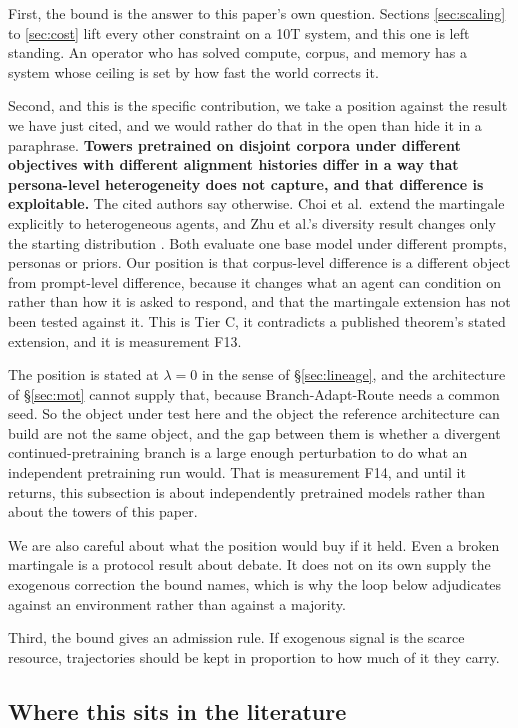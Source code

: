\documentclass[11pt]{article}
\begin{document}
First, the bound is the answer to this paper's own question. Sections \ref{sec:scaling} to \ref{sec:cost} lift every other constraint on a 10T system, and this one is left standing. An operator who has solved compute, corpus, and memory has a system whose ceiling is set by how fast the world corrects it.

Second, and this is the specific contribution, we take a position against the result we have just cited, and we would rather do that in the open than hide it in a paraphrase. \textbf{Towers pretrained on disjoint corpora under different objectives with different alignment histories differ in a way that persona-level heterogeneity does not capture, and that difference is exploitable.} The cited authors say otherwise. Choi et al.\ extend the martingale explicitly to heterogeneous agents, and Zhu et al.'s diversity result changes only the starting distribution \cite{choi2025debatevote,zhu2026debate}. Both evaluate one base model under different prompts, personas or priors. Our position is that corpus-level difference is a different object from prompt-level difference, because it changes what an agent can condition on rather than how it is asked to respond, and that the martingale extension has not been tested against it. This is Tier C, it contradicts a published theorem's stated extension, and it is measurement F13.

The position is stated at $\lambda = 0$ in the sense of \S\ref{sec:lineage}, and the architecture of \S\ref{sec:mot} cannot supply that, because Branch-Adapt-Route needs a common seed. So the object under test here and the object the reference architecture can build are not the same object, and the gap between them is whether a divergent continued-pretraining branch is a large enough perturbation to do what an independent pretraining run would. That is measurement F14, and until it returns, this subsection is about independently pretrained models rather than about the towers of this paper.

We are also careful about what the position would buy if it held. Even a broken martingale is a protocol result about debate. It does not on its own supply the exogenous correction the bound names, which is why the loop below adjudicates against an environment rather than against a majority.

Third, the bound gives an admission rule. If exogenous signal is the scarce resource, trajectories should be kept in proportion to how much of it they carry.

\subsection{Where this sits in the literature}
\end{document}
